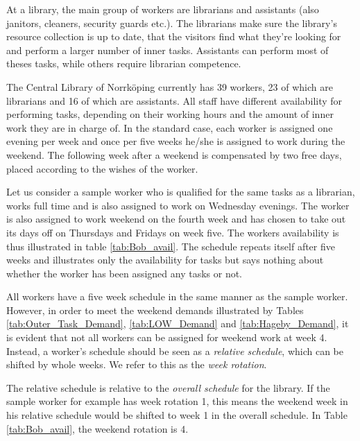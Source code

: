 At a library, the main group of workers are librarians and assistants (also janitors, cleaners, security guards etc.). The librarians make sure the library's resource collection is up to date, that the visitors find what they're looking for and perform a larger number of inner tasks. Assistants can perform most of theses tasks, while others require librarian competence.

The Central Library of Norrköping currently has 39 workers, 23 of which are librarians and 16 of which are assistants. All staff have different availability for performing tasks, depending on their working hours and the amount of inner work they are in charge of. In the standard case, each worker is assigned one evening per week and once per five weeks he/she is assigned to work during the weekend. The following week after a weekend is compensated by two free days, placed according to the wishes of the worker.

Let us consider a sample worker who is qualified for the same tasks as a librarian, works full time and is also assigned to work on Wednesday evenings. The worker is also assigned to work weekend on the fourth week and has chosen to take out its days off on Thursdays and Fridays on week five. The workers availability is thus illustrated in table \ref{tab:Bob_avail}. The schedule repeats itself after five weeks and illustrates only the availability for tasks but says nothing about whether the worker has been assigned any tasks or not.

All workers have a five week schedule in the same manner as the sample worker. However, in order to meet the weekend demands illustrated by Tables \ref{tab:Outer_Task_Demand}, \ref{tab:LOW_Demand} and \ref{tab:Hageby_Demand}, it is evident that not all workers can be assigned for weekend work at week 4. Instead, a worker's schedule should be seen as a \textit{relative schedule}, which can be shifted by whole weeks. We refer to this as the \textit{week rotation}.

The relative schedule is relative to the \textit{overall schedule} for the library. If the sample worker for example has week rotation 1, this means the weekend week in his relative schedule would be shifted to week 1 in the overall schedule. In Table \ref{tab:Bob_avail}, the weekend rotation is 4.



